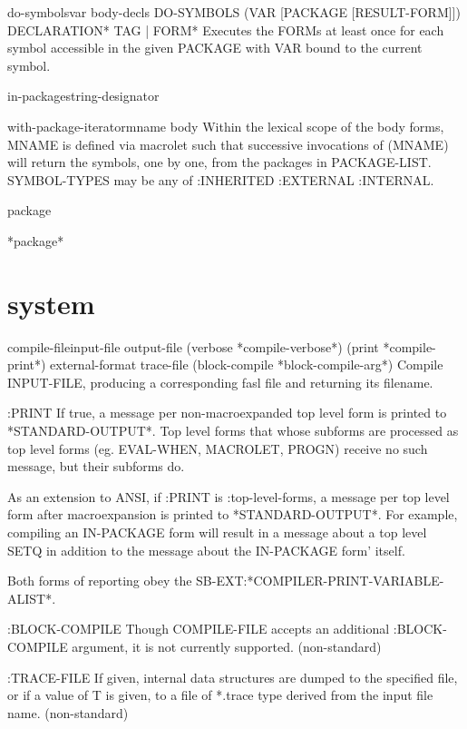 \documentclass[10pt,english]{book}
\begin{document}
\begin{macro}{do-symbols}{var \body body-decls}
  DO-SYMBOLS (VAR [PACKAGE [RESULT-FORM]]) {DECLARATION}* {TAG | FORM}*
   Executes the FORMs at least once for each symbol accessible in the given
   PACKAGE with VAR bound to the current symbol.
\end{macro}

\begin{macro}{in-package}{string-designator}
  
\end{macro}

\begin{macro}{with-package-iterator}{mname \body body}
  Within the lexical scope of the body forms, MNAME is defined via macrolet
such that successive invocations of (MNAME) will return the symbols, one by
one, from the packages in PACKAGE-LIST. SYMBOL-TYPES may be any
of :INHERITED :EXTERNAL :INTERNAL.
\end{macro}

\begin{class}{package}{}
  
\end{class}

\begin{variable}{*package*}{}
  
\end{variable}

\section{system}

\begin{function}{compile-file}{input-file \key output-file (verbose *compile-verbose*)
 (print *compile-print*) external-format trace-file
 (block-compile *block-compile-arg*)}
  Compile INPUT-FILE, producing a corresponding fasl file and
returning its filename.

  :PRINT
     If true, a message per non-macroexpanded top level form is printed
     to *STANDARD-OUTPUT*. Top level forms that whose subforms are
     processed as top level forms (eg. EVAL-WHEN, MACROLET, PROGN) receive
     no such message, but their subforms do.

     As an extension to ANSI, if :PRINT is :top-level-forms, a message
     per top level form after macroexpansion is printed to *STANDARD-OUTPUT*.
     For example, compiling an IN-PACKAGE form will result in a message about
     a top level SETQ in addition to the message about the IN-PACKAGE form'
     itself.

     Both forms of reporting obey the SB-EXT:*COMPILER-PRINT-VARIABLE-ALIST*.

  :BLOCK-COMPILE
     Though COMPILE-FILE accepts an additional :BLOCK-COMPILE
     argument, it is not currently supported. (non-standard)

  :TRACE-FILE
     If given, internal data structures are dumped to the specified
     file, or if a value of T is given, to a file of *.trace type
     derived from the input file name. (non-standard)
\end{function}
\end{document}
